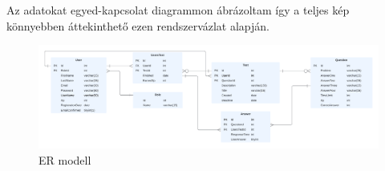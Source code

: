 




\label{Adatmodell}

Az adatokat egyed-kapcsolat diagrammon ábrázoltam így a teljes kép könnyebben áttekinthető ezen rendszervázlat alapján.

\begin{figure}[H]
    \centering
    \includegraphics[width=\linewidth]{images/TestME_ER.png}
    \caption{ER modell}
    \label{fig:TestME_ER}
\end{figure}

